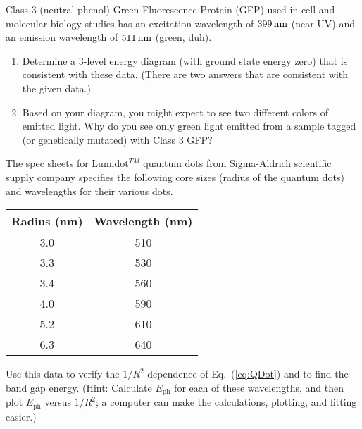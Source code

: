 
\begin{problem}
Class 3 (neutral phenol) Green Fluorescence Protein (GFP) used in cell
and molecular biology studies has an excitation wavelength of 
$399\,\mbox{nm}$
(near-UV) and an emission wavelength of $511\,\mbox{nm}$ (green, duh).
\begin{enumerate}
\item Determine a 3-level energy diagram (with ground state energy
zero) that is consistent with these data. (There are two answers
that are consistent with the given data.)
\item Based on your diagram, you might expect to see two different
colors of emitted light. Why do you see only green light emitted
from a sample tagged (or genetically mutated) with Class 3 GFP?
\end{enumerate}
\end{problem}

\newpage


\begin{problem}
The spec sheets for Lumidot$^{TM}$ quantum dots from Sigma-Aldrich
scientific supply company specifies the following core sizes (radius
of the quantum dots) and wavelengths for their various dots.
\begin{center}
\begin{tabular}{c | c}
Radius (nm) & Wavelength (nm) \\
\hline
3.0 & 510 \\
3.3 & 530 \\
3.4 & 560 \\
4.0 & 590 \\
5.2 & 610 \\
6.3 & 640 \\
\end{tabular}
\end{center}

\noindent Use this data to verify the $1/R^2$ dependence 
of Eq.~(\ref{eq:QDot}) and to find the band gap energy. (Hint: Calculate 
$E_\text{ph}$ for each of these wavelengths, and then plot $E_\text{ph}$ 
versus $1/R^2$; a computer can make the calculations, plotting, and 
fitting easier.)
\end{problem}
